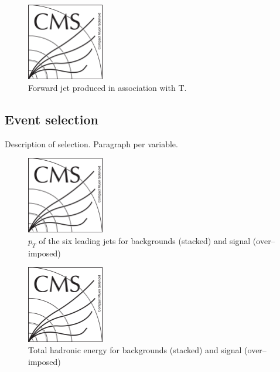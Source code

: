 \begin{figure}[!Hhtbp]
  \begin{center}
    \includegraphics[width=0.3\textwidth]{figs/CMSlogo.png}
    \caption{Forward jet produced in association with T.}
    \label{fig:ForwJ}
  \end{center}
\end{figure}

\subsection{Event selection}
\label{sec:Psel}

Description of selection. Paragraph per variable.

\begin{figure}[!Hhtbp]
  \begin{center}
    \includegraphics[width=0.3\textwidth]{figs/CMSlogo.png}
    \caption{$p_{T}$  of the six leading jets for backgrounds (stacked) and signal (over--imposed)}
    \label{fig:Var1}
  \end{center}
\end{figure}

\begin{figure}[!Hhtbp]
  \begin{center}
    \includegraphics[width=0.3\textwidth]{figs/CMSlogo.png}
    \caption{Total hadronic energy for backgrounds (stacked) and signal (over--imposed)}
    \label{fig:Var2}
  \end{center}
\end{figure}

